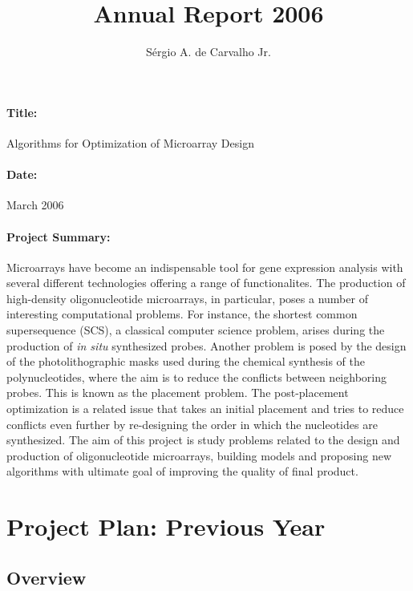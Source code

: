 \documentclass{article}
\begin{document}
\thispagestyle{empty}

\title{Annual Report 2006}
\author{S\'ergio A. de Carvalho Jr.}
\date{}

\maketitle

\paragraph{Title:}Algorithms for Optimization of Microarray Design

\paragraph{Date:}March 2006

\paragraph{Project Summary:}

Microarrays have become an indispensable tool for gene expression analysis with several different technologies offering a range of functionalites. The production of high-density oligonucleotide microarrays, in particular, poses a number of interesting computational problems. For instance, the shortest common supersequence (SCS), a classical computer science problem, arises during the production of \emph{in situ} synthesized probes. Another problem is posed by the design of the photolithographic masks used during the chemical synthesis of the polynucleotides, where the aim is to reduce the conflicts between neighboring probes. This is known as the placement problem. The post-placement optimization is a related issue that takes an initial placement and tries to reduce conflicts even further by re-designing the order in which the nucleotides are synthesized. The aim of this project is study problems related to the design and production of oligonucleotide microarrays, building models and proposing new algorithms with ultimate goal of improving the quality of final product.

\section*{Project Plan: Previous Year}

\subsection*{Overview}
\end{document}
